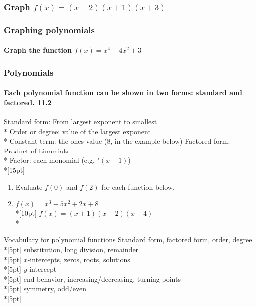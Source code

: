 \documentclass{beamer}
\begin{document}
\frame
{
  \frametitle{Graph $f(x)=(x-2)(x+1)(x+3)$}
  
}

\frame
{
  \frametitle{Graphing polynomials}
  \framesubtitle{Graph the function $f(x)=x^4-4x^2+3$}
  
}

\frame
{
  \frametitle{Polynomials}
  \framesubtitle{Each polynomial function can be shown in two forms: standard and factored. \qquad \qquad \qquad \alert{11.2}}
\alert{Standard form}: From largest exponent to smallest\\*
\qquad \alert{Order or degree}: value of the largest exponent\\*
\qquad \alert{Constant term}: the ones value (8, in the example below)
\alert{Factored form}: Product of binomials\\*
\qquad \alert{Factor}: each monomial (e.g. "$(x+1)$)\\*[15pt]
  \begin{enumerate}
    \item Evaluate $f(0)$ and $f(2)$ for each function below.
      \item $f(x)=x^3-5x^2+2x+8$ \qquad \\*[10pt]
      $f(x)=(x+1)(x-2)(x-4)$\\*

  \end{enumerate}
}

\begin{frame}{Vocabulary for polynomial functions}
    Standard form, factored form, order, degree\\*[5pt]
    substitution, long division, remainder\\*[5pt]
    $x$-intercepts, zeros, roots, solutions\\*[5pt]
    $y$-intercept\\*[5pt]
    end behavior, increasing/decreasing, turning points\\*[5pt]
    symmetry, odd/even\\*[5pt]
\end{frame}
\end{document}
